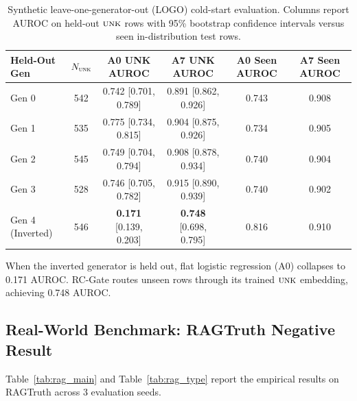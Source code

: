 \documentclass[pdflatex,sn-mathphys,Numbered]{sn-jnl}
\begin{document}
\begin{table}[htbp]
\caption{Synthetic leave-one-generator-out (LOGO) cold-start evaluation. Columns report AUROC on held-out $\textsc{unk}$ rows with 95\% bootstrap confidence intervals versus seen in-distribution test rows.}\label{tab:syn_logo}
\footnotesize
\setlength{\tabcolsep}{3.5pt}
\begin{tabular}{@{}lccccc@{}}
\toprule
\textbf{Held-Out Gen} & $N_{\textsc{unk}}$ & \textbf{A0 UNK AUROC} & \textbf{A7 UNK AUROC} & \textbf{A0 Seen AUROC} & \textbf{A7 Seen AUROC} \\
\midrule
Gen 0 & 542 & 0.742 [0.701, 0.789] & 0.891 [0.862, 0.926] & 0.743 & 0.908 \\
Gen 1 & 535 & 0.775 [0.734, 0.815] & 0.904 [0.875, 0.926] & 0.734 & 0.905 \\
Gen 2 & 545 & 0.749 [0.704, 0.794] & 0.908 [0.878, 0.934] & 0.740 & 0.904 \\
Gen 3 & 528 & 0.746 [0.705, 0.782] & 0.915 [0.890, 0.939] & 0.740 & 0.902 \\
Gen 4 (Inverted) & 546 & \textbf{0.171} [0.139, 0.203] & \textbf{0.748} [0.698, 0.795] & 0.816 & 0.910 \\
\bottomrule
\end{tabular}
\end{table}

When the inverted generator is held out, flat logistic regression (A0) collapses to 0.171 AUROC. RC-Gate routes unseen rows through its trained $\textsc{unk}$ embedding, achieving 0.748 AUROC.

\subsection{Real-World Benchmark: RAGTruth Negative Result}\label{subsec:results_ragtruth}

Table~\ref{tab:rag_main} and Table~\ref{tab:rag_type} report the empirical results on RAGTruth across 3 evaluation seeds.
\end{document}
